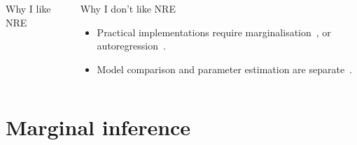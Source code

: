 \documentclass[aspectratio=169]{beamer}
\begin{document}
\begin{frame}
\begin{columns}
{\begin{block}{Why I like NRE}
\begin{itemize}
                \end{itemize}
            \end{block}
            \begin{block}{Why I don't like NRE}
                \begin{itemize}
                    \item Practical implementations require marginalisation~, or autoregression~.
                    \item Model comparison and parameter estimation are separate~.
                \end{itemize}
            \end{block}
        }
    \end{columns}
\end{frame}

\section{Marginal inference}
\end{document}
